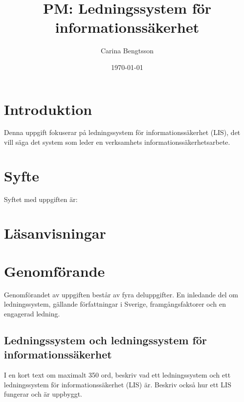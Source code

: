 \documentclass[a4paper]{llncs}
\begin{document}
\title{PM\@: Ledningssystem för informationssäkerhet}
\author{%
  Carina Bengtsson
}
\date{\today}

\maketitle


\section{Introduktion}
\label{sec:introduction}

Denna uppgift fokuserar på ledningssystem för informationssäkerhet (LIS), det 
vill säga det system som leder en verksamhets informationssäkerhetsarbete.


\section{Syfte}
\label{sec:aim}

Syftet med uppgiften är:
\begin{itemize}
  
\end{itemize}


\section{Läsanvisningar}




\section{Genomförande}\label{Work}

Genomförandet av uppgiften består av fyra deluppgifter.
En inledande del om ledningssystem, gällande författningar i Sverige, 
framgångsfaktorer och en engagerad ledning.

\subsection{Ledningssystem och ledningssystem för informationssäkerhet}

I en kort text om maximalt 350 ord, beskriv vad ett ledningssystem och ett 
ledningssystem för informationssäkerhet (LIS) är.
Beskriv också hur ett LIS fungerar och är uppbyggt.
\end{document}
